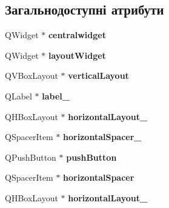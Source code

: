\subsection*{Загальнодоступні атрибути}
\begin{DoxyCompactItemize}
\item 
\hypertarget{classUi__ExUserScreen_a2a99013ef3fceba6fc51ae3cc2d7b2e1}{Q\-Widget $\ast$ {\bfseries centralwidget}}\label{classUi__ExUserScreen_a2a99013ef3fceba6fc51ae3cc2d7b2e1}

\item 
\hypertarget{classUi__ExUserScreen_a898af8b981323f54c0ecd7e5bedb2f4b}{Q\-Widget $\ast$ {\bfseries layout\-Widget}}\label{classUi__ExUserScreen_a898af8b981323f54c0ecd7e5bedb2f4b}

\item 
\hypertarget{classUi__ExUserScreen_a7acd541ca534e13a6926a4f29e643d76}{Q\-V\-Box\-Layout $\ast$ {\bfseries vertical\-Layout}}\label{classUi__ExUserScreen_a7acd541ca534e13a6926a4f29e643d76}

\item 
\hypertarget{classUi__ExUserScreen_ad77213c33b70aebe9f0ca186c90d101e}{Q\-Label $\ast$ {\bfseries label\-\_}}\label{classUi__ExUserScreen_ad77213c33b70aebe9f0ca186c90d101e}

\item 
\hypertarget{classUi__ExUserScreen_ab3f8745ecef533e45add685a3a0e43d5}{Q\-H\-Box\-Layout $\ast$ {\bfseries horizontal\-Layout\-\_}}\label{classUi__ExUserScreen_ab3f8745ecef533e45add685a3a0e43d5}

\item 
\hypertarget{classUi__ExUserScreen_ae94f4b8796e08e30ccd807e67009f63d}{Q\-Spacer\-Item $\ast$ {\bfseries horizontal\-Spacer\-\_}}\label{classUi__ExUserScreen_ae94f4b8796e08e30ccd807e67009f63d}

\item 
\hypertarget{classUi__ExUserScreen_afba2a4123fe138f23304a56a1b0befff}{Q\-Push\-Button $\ast$ {\bfseries push\-Button}}\label{classUi__ExUserScreen_afba2a4123fe138f23304a56a1b0befff}

\item 
\hypertarget{classUi__ExUserScreen_afa1e70d1828cd20eac01382328721f6f}{Q\-Spacer\-Item $\ast$ {\bfseries horizontal\-Spacer}}\label{classUi__ExUserScreen_afa1e70d1828cd20eac01382328721f6f}

\item 
\hypertarget{classUi__ExUserScreen_a903a62e821583de883b0b1192b7be15f}{Q\-H\-Box\-Layout $\ast$ {\bfseries horizontal\-Layout\-\_}}\label{classUi__ExUserScreen_a903a62e821583de883b0b1192b7be15f}


\end{DoxyCompactItemize}
